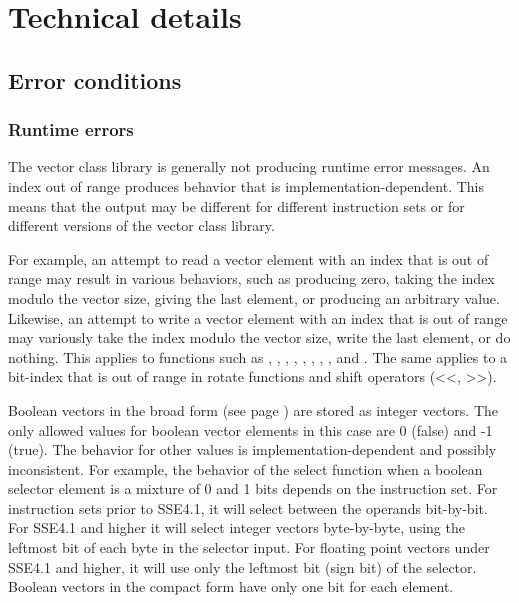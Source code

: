 \documentclass[vcl_manual.tex]{subfiles}
\begin{document}
\chapter{Technical details}\label{chap:TechnicalDetails}

\section{Error conditions}\label{chap:ErrorConditions}

\subsection{Runtime errors}\label{RuntimeErrors}
\flushleft

The vector class library is generally not producing runtime error messages. An index out of range produces behavior that is implementation-dependent. This means that the output may be different for different instruction sets or for different versions of the vector class library.

For example, an attempt to read a vector element with an index that is out of range may result in various behaviors, such as producing zero, taking the index modulo the vector size, giving the last element, or producing an arbitrary value. Likewise, an attempt to write a vector element with an index that is out of range may variously take the index modulo the vector size, write the last element, or do nothing. This applies to functions such as , , , , , , , , and . The same applies to a bit-index that is out of range in rotate functions
and shift operators (\textless \textless , \textgreater \textgreater).

Boolean vectors in the broad form (see page \pageref{tableBooleanVectorSizes}) are stored as integer vectors. The only allowed values for boolean vector elements in this case are 0 (false) and -1 (true). The behavior for other values is implementation-dependent and possibly inconsistent. For example, the behavior of the select function when a boolean selector element is a mixture of 0 and 1 bits depends on the instruction set. For instruction sets prior to SSE4.1, it will select between the operands bit-by-bit. For SSE4.1 and higher it will select integer vectors byte-by-byte, using the leftmost bit of each byte in the selector input. For floating point vectors under SSE4.1 and higher, it will use only the leftmost bit (sign bit) of the selector. Boolean vectors in the compact form have only one bit for each element.
\end{document}
